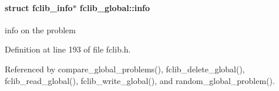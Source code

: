 \paragraph[{info}]{\setlength{\rightskip}{0pt plus 5cm}struct {\bf fclib\+\_\+info}$\ast$ fclib\+\_\+global\+::info}\label{structfclib__global_aa6b4e80afc92dd1a9b260ff3a096b352}


info on the problem 



Definition at line 193 of file fclib.\+h.



Referenced by compare\+\_\+global\+\_\+problems(), fclib\+\_\+delete\+\_\+global(), fclib\+\_\+read\+\_\+global(), fclib\+\_\+write\+\_\+global(), and random\+\_\+global\+\_\+problem().

